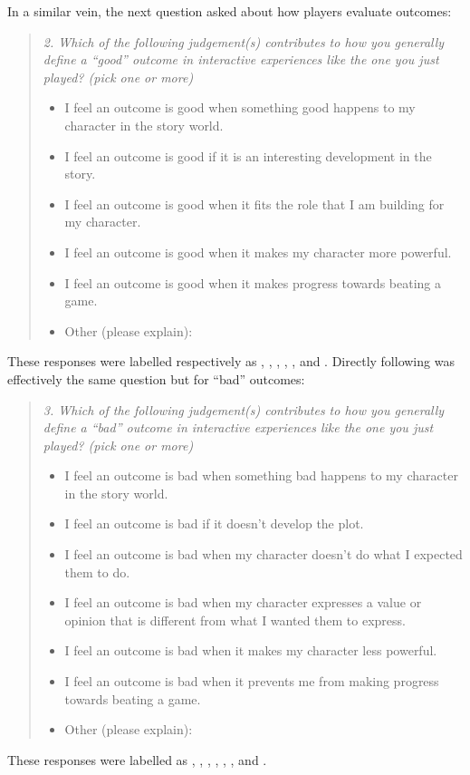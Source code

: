 In a similar vein, the next question asked about how players evaluate outcomes:
%
\begin{quote}
  \slshape
  2. Which of the following judgement(s) contributes to how you generally define a ``good'' outcome in interactive experiences like the one you just played? (pick one or more) \\
  \begin{itemize}
    \item[\ding{111}] I feel an outcome is good when something good happens to my character in the story world.
    \item[\ding{111}] I feel an outcome is good if it is an interesting development in the story.
    \item[\ding{111}] I feel an outcome is good when it fits the role that I am building for my character.
    \item[\ding{111}] I feel an outcome is good when it makes my character more powerful.
    \item[\ding{111}] I feel an outcome is good when it makes progress towards beating a game.
    \item[\ding{111}] Other (please explain):
  \end{itemize}
\end{quote}
%
These responses were labelled respectively as , , , , , and .
%
Directly following was effectively the same question but for ``bad'' outcomes:
%
\begin{quote}
  \slshape
  3. Which of the following judgement(s) contributes to how you generally define a ``bad'' outcome in interactive experiences like the one you just played? (pick one or more)
  \begin{itemize}
    \item[\ding{111}] I feel an outcome is bad when something bad happens to my character in the story world.
    \item[\ding{111}] I feel an outcome is bad if it doesn't develop the plot.
    \item[\ding{111}] I feel an outcome is bad when my character doesn't do what I expected them to do.
    \item[\ding{111}] I feel an outcome is bad when my character expresses a value or opinion that is different from what I wanted them to express.
    \item[\ding{111}] I feel an outcome is bad when it makes my character less powerful.
    \item[\ding{111}] I feel an outcome is bad when it prevents me from making progress towards beating a game.
    \item[\ding{111}] Other (please explain):
  \end{itemize}
\end{quote}
%
These responses were labelled as , , , , , , and .

